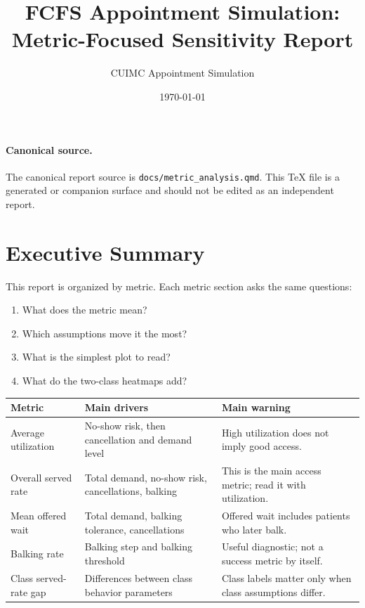 \documentclass[11pt]{article}
\title{FCFS Appointment Simulation: Metric-Focused Sensitivity Report}
\author{CUIMC Appointment Simulation}
\date{\today}
\begin{document}
\maketitle

\paragraph{Canonical source.} The canonical report source is
\texttt{docs/metric\_analysis.qmd}. This TeX file is a generated or companion
surface and should not be edited as an independent report.

\section{Executive Summary}

This report is organized by metric. Each metric section asks the same questions:

\begin{enumerate}
    \item What does the metric mean?
    \item Which assumptions move it the most?
    \item What is the simplest plot to read?
    \item What do the two-class heatmaps add?
\end{enumerate}

\begin{table}[H]
\centering
\renewcommand{\arraystretch}{1.15}
\begin{tabular}{p{}p{}p{}}
\toprule
Metric & Main drivers & Main warning \\
\midrule
Average utilization & No-show risk, then cancellation and demand level & High utilization does not imply good access. \\
Overall served rate & Total demand, no-show risk, cancellations, balking & This is the main access metric; read it with utilization. \\
Mean offered wait & Total demand, balking tolerance, cancellations & Offered wait includes patients who later balk. \\
Balking rate & Balking step and balking threshold & Useful diagnostic; not a success metric by itself. \\
Class served-rate gap & Differences between class behavior parameters & Class labels matter only when class assumptions differ. \\
\bottomrule
\end{tabular}
\end{table}
\end{document}
